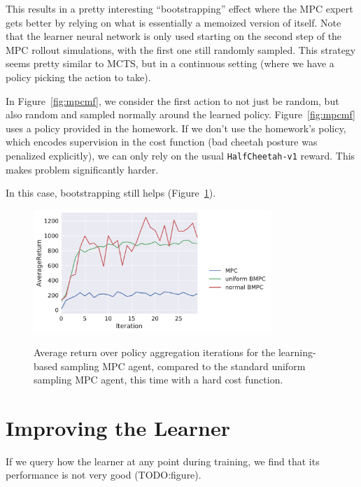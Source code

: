 \documentclass{article}
\begin{document}
This results in a pretty interesting ``bootstrapping'' effect where the MPC expert gets better by relying on what is essentially a memoized version of itself. Note that the learner neural network is only used starting on the second step of the MPC rollout simulations, with the first one still randomly sampled. This strategy seems pretty similar to MCTS, but in a continuous setting (where we have a policy picking the action to take).

In Figure~\ref{fig:mpcmf}, we consider the first action to not just be random, but also random and sampled normally around the learned policy. Figure~\ref{fig:mpcmf} uses a policy provided in the homework. If we don't use the homework's policy, which encodes supervision in the cost function (bad cheetah posture was penalized explicitly), we can only rely on the usual \texttt{HalfCheetah-v1} reward. This makes problem significantly harder.

In this case, bootstrapping still helps (Figure~\ref{fig:hardcost}).

\begin{figure}[!h]
  \begin{center}
    {\includegraphics[width=0.8\textwidth]{hard-AverageReturn.pdf}}
  \end{center}
  \caption{Average return over policy aggregation iterations for the learning-based sampling MPC agent, compared to the standard uniform sampling MPC agent, this time with a hard cost function.}
\label{fig:hardcost}
\end{figure}

\FloatBarrier

\section{Improving the Learner}

If we query how the learner at any point during training, we find that its performance is not very good (TODO:figure). 
\end{document}
